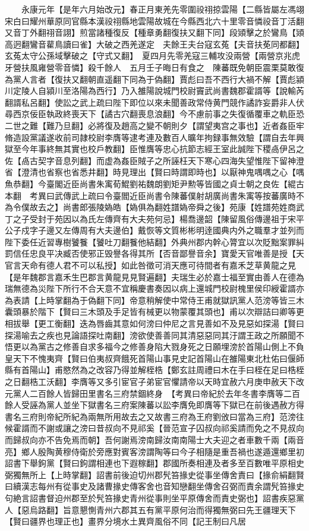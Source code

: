 　　永康元年【是年六月始改元】春正月東羌先零圍祋祤掠雲陽【二縣皆屬左馮翊宋白曰耀州華原同官縣本漢祋祤縣地雲陽故城在今縣西北六十里零音憐祋音丁活翻又音丁外翻祤音詡】煎當諸種復反【種章勇翻復扶又翻下同】段熲擊之於鸞鳥【熲高迥翻鸞音雚鳥讀曰雀】大破之西羌遂定　夫餘王夫台寇玄菟【夫音扶莬同都翻】玄菟太守公孫域擊破之【守式又翻】　夏四月先零羌寇三輔攻没兩營【兩營京兆虎牙營扶風雍營零音憐】殺千餘人　五月壬子晦日有食之　陳蕃既免朝臣震栗莫敢復為黨人言者【復扶又翻朝直遥翻下同為于偽翻】賈彪曰吾不西行大禍不解【賈彪潁川定陵人自潁川至洛陽為西行】乃入雒陽說城門校尉竇武尚書魏郡霍諝等【說輸芮翻諝私呂翻】使訟之武上疏曰陛下即位以來未聞善政常侍黄門競作譎詐妄爵非人伏尋西京佞臣執政終喪天下【譎古穴翻喪息浪翻】今不慮前事之失復循覆車之軌臣恐二世之難【難乃旦翻】必將復及趙高之變不朝則夕【謂望夷宫之事也】近者姦臣牢脩造設黨議遂收前司隷校尉李膺等逮考連及數百人曠年拘録事無效驗【謂自去年興獄至今年事終無其實也校戶教翻】臣惟膺等忠心抗節志經王室此誠陛下稷卨伊呂之佐【卨古契字音息列翻】而虚為姦臣賊子之所誣枉天下寒心四海失望惟陛下留神澄省【澄清也省察也省悉井翻】時見理出【賢曰時謂即時也】以厭神鬼喁喁之心【喁魚恭翻】今臺閣近臣尚書朱㝢荀鯤劉祐魏朗劉矩尹勲等皆國之貞士朝之良佐【緄古本翻　考異曰武傳武上疏曰令臺閻近臣尚書令陳蕃僕射胡廣尚書朱㝢等按蕃廣時不為令僕故去之】尚書郎張陵媯皓【媯俱為翻姓譜媯帝舜之後】苑康【姓譜苑姓商武丁之子受封于苑因以為氏左傳齊有大夫苑何忌】楊喬邊韶【陳留風俗傳邊祖于宋平公子戍字子邊又左傳周有大夫邊伯】戴恢等文質彬彬明逹國典内外之職羣才並列而陛下委任近習專樹饕餮【饕吐刀翻餮他結翻】外典州郡内幹心膂宜以次貶黜案罪糾罰信任忠良平决臧否使邪正毁譽各得其所【否音鄙譽音余】寶愛天官唯善是授【天官言天命有德人君不可以私授】如此咎徵可消天應可待間者有嘉禾芝草黄龍之見【是年魏郡言嘉禾生巴郡言黄龍見見賢遍翻】夫瑞生必於嘉士福至實由善人在德為瑞無德為災陛下所行不合天意不宜稱慶書奏因以病上還城門校尉槐里侯印綬霍諝亦為表請【上時掌翻為于偽翻下同】帝意稍解使中常侍王甫就獄訊黨人范滂等皆三木囊頭暴於階下【賢曰三木頭及手足皆有械更以物蒙覆其頭也】甫以次辯詰曰卿等更相拔舉【更工衡翻】迭為唇齒其意如何滂曰仲尼之言見善如不及見惡如探湯【賢曰探湯喻去之疾也見論語探吐南翻】滂欲使善善同其清惡惡同其汙謂王政之所願聞不悟更以為黨古之修善自求多福今之修善身陷大戮身死之日願埋滂於首陽山側上不負皇天下不愧夷齊【賢曰伯夷叔齊餓死首陽山事見史記首陽山在雒陽東北杜佑曰偃師縣有首陽山】甫愍然為之改容乃得並解桎梏【鄭玄註周禮曰木在手曰桎在足曰梏桎之日翻梏工沃翻】李膺等又多引宦官子弟宦官懼請帝以天時宜赦六月庚申赦天下改元黨人二百餘人皆歸田里書名三府禁錮終身　【考異曰帝紀於去年冬書李膺等二百餘人受誣為黨人並坐下獄書名三府案陳蕃以訟李膺免即膺等下獄已在前後遇赦方得書名三府則帝紀所紀為兩無所用故去之又故書三府為王府劉攽曰當為三府】范滂往候霍諝而不謝或讓之滂曰昔叔向不見祁奚【晉范宣子囚叔向祁奚請而免之不見叔向而歸叔向亦不告免焉而朝】吾何謝焉滂南歸汝南南陽士大夫迎之者車數千兩【兩音亮】鄉人殷陶黄穆侍衛於旁應對賓客滂謂陶等曰今子相隨是重吾禍也遂遁還鄉里初詔書下舉鉤黨【賢曰鉤謂相連也下遐稼翻】郡國所奏相連及者多至百數唯平原相史弼獨無所上【上時掌翻】詔書前後迫切州郡髠笞掾史從事坐傳舍責曰【掾俞絹翻賢曰續漢志每州有從事史及諸曹掾史傳客舍也音知戀翻坐傳舍召弼而責余謂髠笞掾史句絶言詔書督迫州郡至於髠笞掾史青州從事則坐平原傳舍而責史弼也】詔書疾惡黨人【惡烏路翻】旨意懇惻青州六郡其五有黨平原何治而得獨無弼曰先王疆理天下【賢曰疆界也理正也】畫界分境水土異齊風俗不同【記王制曰凡居